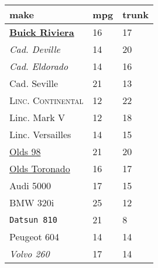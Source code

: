 \documentclass{article}
\begin{document}
\begin{table}[tbp] \centering
{}

\begin{tabularx}{\linewidth}{@{}lCC@{}}

\toprule
{make}&{mpg}&{trunk} \tabularnewline
\midrule \addlinespace[\belowrulesep]
\underline{\textbf{Buick Riviera}}&16&17 \tabularnewline
\textsl{Cad. Deville}&14&20 \tabularnewline
\textit{Cad. Eldorado}&14&16 \tabularnewline
Cad. Seville&21&13 \tabularnewline
\textsc{Linc. Continental}&12&22 \tabularnewline
\textsf{Linc. Mark V}&12&18 \tabularnewline
Linc. Versailles&14&15 \tabularnewline
\underline{Olds 98}&21&20 \tabularnewline
\underline{Olds Toronado}&16&17 \tabularnewline
Audi 5000&17&15 \tabularnewline
BMW 320i&25&12 \tabularnewline
\texttt{Datsun 810}&21&8 \tabularnewline
Peugeot 604&14&14 \tabularnewline
\emph{Volvo 260}&17&14 \tabularnewline
\bottomrule 

\end{tabularx}
\end{table}
\end{document}
